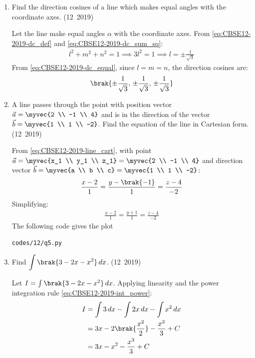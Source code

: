 \begin{enumerate}[label=\thesubsection.\arabic*, ref=\thesubsection.\theenumi]
\item Find the direction cosines of a line which makes equal angles with the coordinate axes.
\hfill (12~2019)

\solution
Let the line make equal angles $\alpha$ with the coordinate axes. From \eqref{eq:CBSE12-2019-dc_def} and \eqref{eq:CBSE12-2019-dc_sum_sq}:
\begin{align}
	l^2 + m^2 + n^2 = 1 \implies 3l^2 = 1 \implies l = \pm\frac{1}{\sqrt{3}}
\end{align}
From \eqref{eq:CBSE12-2019-dc_equal}, since $l = m = n$, the direction cosines are:
\begin{align}
	\brak{\pm\frac{1}{\sqrt{3}}, \, \pm\frac{1}{\sqrt{3}}, \, \pm\frac{1}{\sqrt{3}}}
\end{align}

\item A line passes through the point with position vector $\vec{a} = \myvec{2 \\ -1 \\ 4}$ and is in the direction of the vector $\vec{b} = \myvec{1 \\ 1 \\ -2}$. Find the equation of the line in Cartesian form.
\hfill (12~2019)

\solution
From \eqref{eq:CBSE12-2019-line_cart}, with point $\vec{a} = \myvec{x_1 \\ y_1 \\ z_1} = \myvec{2 \\ -1 \\ 4}$ and direction vector $\vec{b} = \myvec{a \\ b \\ c} = \myvec{1 \\ 1 \\ -2}$:
\begin{align}
	\frac{x - 2}{1} = \frac{y - \brak{-1}}{1} = \frac{z - 4}{-2}
\end{align}
Simplifying:
\begin{align}
	\frac{x - 2}{1} = \frac{y + 1}{1} = \frac{z - 4}{-2}
\end{align}
The following code gives the plot
\begin{lstlisting}[frame=single, basicstyle=\ttfamily\small]
	codes/12/q5.py
\end{lstlisting}

\item Find $\displaystyle\int \brak{3 - 2x - x^2}\,dx$.
\hfill (12~2019)

\solution
Let $I = \int \brak{3 - 2x - x^2}\,dx$.
Applying linearity and the power integration rule \eqref{eq:CBSE12-2019-int_power}:
\begin{align}
	I &= \int 3\,dx - \int 2x\,dx - \int x^2\,dx \\
	&= 3x - 2\brak{\frac{x^2}{2}} - \frac{x^3}{3} + C \\
	&= 3x - x^2 - \frac{x^3}{3} + C
\end{align}



\end{enumerate}

